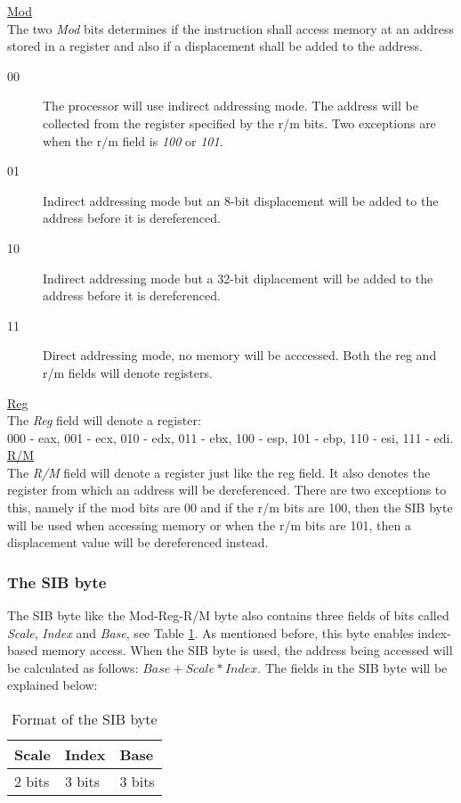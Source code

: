\documentclass[11pt,twoside]{eitExjobb}
\begin{document}
\noindent \uline{Mod}\\
The two \emph{Mod} bits determines if the instruction shall access memory at an address stored in a register and also if a displacement shall be added to the address.\\
\begin{description}
\item[00] The processor will use indirect addressing mode. The address will be collected from the register specified by the r/m bits. Two exceptions are when the r/m field is \emph{100} or \emph{101}.  
\item[01] Indirect addressing mode but an 8-bit displacement will be added to the address before it is dereferenced.
\item[10] Indirect addressing mode but a 32-bit diplacement will be added to the address before it is dereferenced.
\item[11] Direct addressing mode, no memory will be acccessed. Both the reg and r/m fields will denote registers.
\end{description}

\noindent \uline{Reg}\\
The \emph{Reg} field will denote a register: \\ 000 - eax, 001 - ecx, 010 - edx, 011 - ebx, 100 - esp, 101 - ebp, 110 - esi, 111 - edi.\\


\noindent \uline{R/M}\\
The \emph{R/M} field will denote a register just like the reg field. It also denotes the register from which an address will be dereferenced. There are two exceptions to this, namely if the mod bits are 00 and if the r/m bits are 100, then the SIB byte will be used when accessing memory or when the r/m bits are 101, then a displacement value will be dereferenced instead.

\subsubsection{The SIB byte}
The SIB byte like the Mod-Reg-R/M byte also contains three fields of bits called \emph{Scale}, \emph{Index} and \emph{Base}, see Table \ref{table:sibbyte}. As mentioned before, this byte enables index-based memory access. When the SIB byte is used, the address being accessed will be calculated as follows:
$Base + Scale*Index$. The fields in the SIB byte will be explained below:\\

\begin{table}[h]
\begin{tabular}{|l|l|l|}
\hline
Scale & Index & Base \\
\hline
2 bits & 3 bits & 3 bits \\
\hline
\end{tabular}
\caption{Format of the SIB byte}
\label{table:sibbyte}
\end{table}
\end{document}
